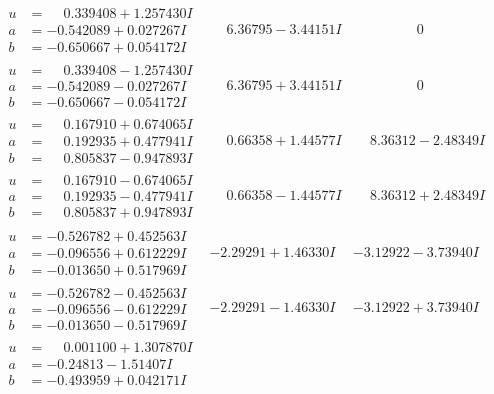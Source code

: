 \documentclass[1p]{elsarticle_modified}
\theoremstyle{definition}
\begin{document}
$$\begin{array}{c|c|c}
\begin{aligned}
u &= \phantom{-}0.339408 + 1.257430 I \\
a &= -0.542089 + 0.027267 I \\
b &= -0.650667 + 0.054172 I\end{aligned}
 & \phantom{-}6.36795 - 3.44151 I & \phantom{-0.000000 } 0 \\ \hline\begin{aligned}
u &= \phantom{-}0.339408 - 1.257430 I \\
a &= -0.542089 - 0.027267 I \\
b &= -0.650667 - 0.054172 I\end{aligned}
 & \phantom{-}6.36795 + 3.44151 I & \phantom{-0.000000 } 0 \\ \hline\begin{aligned}
u &= \phantom{-}0.167910 + 0.674065 I \\
a &= \phantom{-}0.192935 + 0.477941 I \\
b &= \phantom{-}0.805837 - 0.947893 I\end{aligned}
 & \phantom{-}0.66358 + 1.44577 I & \phantom{-}8.36312 - 2.48349 I \\ \hline\begin{aligned}
u &= \phantom{-}0.167910 - 0.674065 I \\
a &= \phantom{-}0.192935 - 0.477941 I \\
b &= \phantom{-}0.805837 + 0.947893 I\end{aligned}
 & \phantom{-}0.66358 - 1.44577 I & \phantom{-}8.36312 + 2.48349 I \\ \hline\begin{aligned}
u &= -0.526782 + 0.452563 I \\
a &= -0.096556 + 0.612229 I \\
b &= -0.013650 + 0.517969 I\end{aligned}
 & -2.29291 + 1.46330 I & -3.12922 - 3.73940 I \\ \hline\begin{aligned}
u &= -0.526782 - 0.452563 I \\
a &= -0.096556 - 0.612229 I \\
b &= -0.013650 - 0.517969 I\end{aligned}
 & -2.29291 - 1.46330 I & -3.12922 + 3.73940 I \\ \hline\begin{aligned}
u &= \phantom{-}0.001100 + 1.307870 I \\
a &= -0.24813 - 1.51407 I \\
b &= -0.493959 + 0.042171 I\end{aligned}

\end{array}$$
\end{document}
